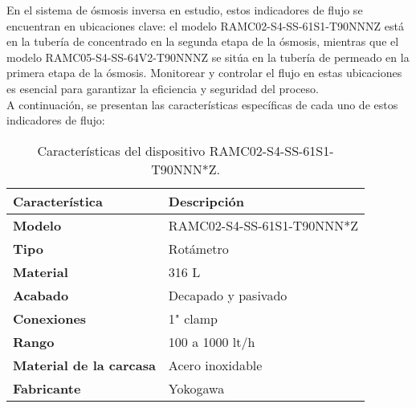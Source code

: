 En el sistema de ósmosis inversa en estudio, estos indicadores de flujo se encuentran en ubicaciones clave: el modelo RAMC02-S4-SS-61S1-T90NNNZ está en la tubería de concentrado en la segunda etapa de la ósmosis, mientras que el modelo RAMC05-S4-SS-64V2-T90NNNZ se sitúa en la tubería de permeado en la primera etapa de la ósmosis. Monitorear y controlar el flujo en estas ubicaciones es esencial para garantizar la eficiencia y seguridad del proceso.\\

A continuación, se presentan las características específicas de cada uno de estos indicadores de flujo:\\

\begin{table}[H]
    \centering
    \caption{Características del dispositivo RAMC02-S4-SS-61S1-T90NNN*Z.}
    \label{table:dispositivoRAMC02}
    \begin{tabular}{| L{5cm} | L{5cm} |}
        \hline
        \textbf{Característica} & \textbf{Descripción}  \\
        \hline
        \textbf{Modelo} & RAMC02-S4-SS-61S1-T90NNN*Z  \\
        \hline
        \textbf{Tipo} & Rotámetro  \\
        \hline
        \textbf{Material} & 316 L  \\
        \hline
        \textbf{Acabado} & Decapado y pasivado  \\
        \hline
        \textbf{Conexiones} & 1" clamp  \\
        \hline
        \textbf{Rango} & 100 a 1000 lt/h  \\
        \hline
        \textbf{Material de la carcasa} & Acero inoxidable  \\
        \hline
        \textbf{Fabricante} & Yokogawa  \\
        \hline
    \end{tabular}
\end{table}


